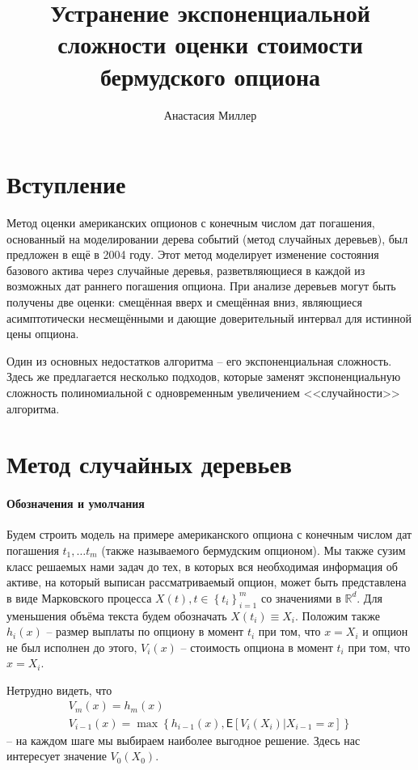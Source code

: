 \documentclass[12pt,twoside,titlepage,сa4paper]{article}
\title{Устранение экспоненциальной сложности оценки стоимости бермудского опциона}
\author{Анастасия Миллер}
\begin{document}
\maketitle
\tableofcontents
\newpage
\section{Вступление}
	\par Метод оценки американских опционов с конечным числом дат погашения, основанный на моделировании дерева событий (метод случайных деревьев), был предложен в  ещё в 2004 году. Этот метод моделирует изменение состояния базового актива через случайные деревья, разветвляющиеся в каждой из возможных дат раннего погашения опциона. При анализе деревьев могут быть получены две оценки: смещённая вверх и смещённая вниз, являющиеся асимптотически несмещёнными и дающие доверительный интервал для истинной цены опциона. 
	\par Один из основных недостатков алгоритма -- его экспоненциальная сложность. Здесь же предлагается несколько подходов, которые заменят экспоненциальную сложность полиномиальной с одновременным увеличением <<случайности>> алгоритма.
\section{Метод случайных деревьев}
	\paragraph{Обозначения и умолчания}
	\par Будем строить модель на примере американского опциона с конечным числом дат погашения $t_1, \ldots t_m$ (также называемого бермудским опционом). Мы также сузим класс решаемых нами задач до тех, в которых вся необходимая информация об активе, на который выписан рассматриваемый опцион, может быть представлена в виде Марковского процесса $X\left( t \right), t \in \left\lbrace t_i \right\rbrace_{i = 1}^m$ со значениями в $\mathbb{R}^d$. Для уменьшения объёма текста будем обозначать $X\left(t_i\right) \equiv X_i$. Положим также $h_i\left(x\right)$ -- размер выплаты по опциону в момент $t_i$ при том, что $x = X_i$ и опцион не был исполнен до этого, $V_i\left(x\right)$ -- стоимость опциона в момент $t_i$ при том, что $x = X_i$.
	\par Нетрудно видеть, что
		\begin{eqnarray}\label{eq:option-recursive}
			V_m\left(x\right) = h_m\left(x\right) \\
			V_{i-1}\left(x\right) = \max\left\lbrace h_{i-1}\left(x\right), \mathsf{E}\left[V_i\left(X_i\right)|X_{i-1}=x\right]\right\rbrace
		\end{eqnarray}
	 -- на каждом шаге мы выбираем наиболее выгодное решение. Здесь нас интересует значение $V_0\left(X_0\right)$.
\end{document}
